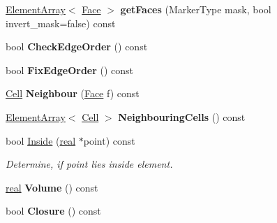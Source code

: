 \begin{DoxyCompactItemize}
\item 
\hypertarget{classINMOST_1_1Cell_a631a1c2f3e429ecd32f7d8c60ee5b9c0}{\hyperlink{classINMOST_1_1ElementArray}{Element\-Array}$<$ \hyperlink{classINMOST_1_1Face}{Face} $>$ {\bfseries get\-Faces} (Marker\-Type mask, bool invert\-\_\-mask=false) const }\label{classINMOST_1_1Cell_a631a1c2f3e429ecd32f7d8c60ee5b9c0}

\item 
\hypertarget{classINMOST_1_1Cell_afc84112c4d1f84b15799ffb91615cd30}{bool {\bfseries Check\-Edge\-Order} () const }\label{classINMOST_1_1Cell_afc84112c4d1f84b15799ffb91615cd30}

\item 
\hypertarget{classINMOST_1_1Cell_a84eaa268f8c3886e1164ea14715f2419}{bool {\bfseries Fix\-Edge\-Order} () const }\label{classINMOST_1_1Cell_a84eaa268f8c3886e1164ea14715f2419}

\item 
\hypertarget{classINMOST_1_1Cell_ac835f99e4a99a2a94fec5e041145d8df}{\hyperlink{classINMOST_1_1Cell}{Cell} {\bfseries Neighbour} (\hyperlink{classINMOST_1_1Face}{Face} f) const }\label{classINMOST_1_1Cell_ac835f99e4a99a2a94fec5e041145d8df}

\item 
\hypertarget{classINMOST_1_1Cell_a47bc37b5c0fc45e2536f78787280fb4d}{\hyperlink{classINMOST_1_1ElementArray}{Element\-Array}$<$ \hyperlink{classINMOST_1_1Cell}{Cell} $>$ {\bfseries Neighbouring\-Cells} () const }\label{classINMOST_1_1Cell_a47bc37b5c0fc45e2536f78787280fb4d}

\item 
bool \hyperlink{classINMOST_1_1Cell_a06c7320fcbc00ede688cb56ade66f785}{Inside} (\hyperlink{classINMOST_1_1Storage_a853346784b4a5822a7fac54d8f10f805}{real} $\ast$point) const 
\begin{DoxyCompactList}\small\item\em Determine, if point lies inside element. \end{DoxyCompactList}\item 
\hypertarget{classINMOST_1_1Cell_ae0caec87803ddd108c4fb06decf69e18}{\hyperlink{classINMOST_1_1Storage_a853346784b4a5822a7fac54d8f10f805}{real} {\bfseries Volume} () const }\label{classINMOST_1_1Cell_ae0caec87803ddd108c4fb06decf69e18}

\item 
\hypertarget{classINMOST_1_1Cell_af07f9b3de49505cbe634c32882af2ac1}{bool {\bfseries Closure} () const }\label{classINMOST_1_1Cell_af07f9b3de49505cbe634c32882af2ac1}

\end{DoxyCompactItemize}
